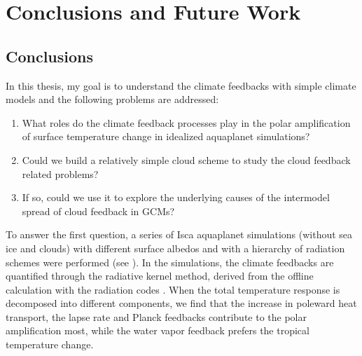 \chapter{Conclusions and Future Work}
\label{ch:conclusion}

\section{Conclusions}
In this thesis, my goal is to understand the climate feedbacks with simple climate models and the following problems are addressed: 
\begin{enumerate}
    \item What roles do the climate feedback processes play in the polar amplification of surface temperature change in idealized aquaplanet simulations?
    \item Could we build a relatively simple cloud scheme to study the cloud feedback related problems?
    \item If so, could we use it to explore the underlying causes of the intermodel spread of cloud feedback in GCMs? 
\end{enumerate}

To answer the first question, a series of Isca \citep{Vallis2018} aquaplanet simulations (without sea ice and clouds) with different surface albedos and with a hierarchy of radiation schemes were performed (see ). In the simulations, the climate feedbacks are quantified through the radiative kernel method, derived from the offline calculation with the radiation codes \citep{Liu2020kernel}. When the total temperature response is decomposed into different components, we find that the increase in poleward heat transport, the lapse rate and Planck feedbacks contribute to the polar amplification most, while the water vapor feedback prefers the tropical temperature change.


